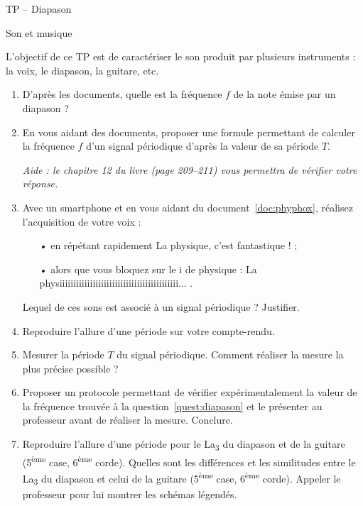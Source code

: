 \documentclass[12pt,a4paper]{article}
\begin{document}
\begin{header}
TP -- Diapason

Son et musique
\end{header}

L'objectif de ce TP est de caractériser le son produit par plusieurs instruments : la voix, le diapason, la guitare, etc.

\begin{enumerate}
\item \app{}
\label{quest:diapason}

D'après les documents, quelle est la fréquence $f$ de la note émise par un diapason ?

\item \app{}

En vous aidant des documents, proposer une formule permettant de calculer la fréquence $f$ d'un signal périodique d'après la valeur de sa période $T$.

\emph{Aide : le chapitre 12 du livre (page 209--211) vous permettra de vérifier votre réponse.}

\item \rea{} \anarai{}

Avec un smartphone et en vous aidant du document~\ref{doc:phyphox}, réalisez l'acquisition de votre voix : 
\begin{itemize}
\item[•] en répétant rapidement \og La physique, c'est fantastique !\fg{} ;
\item[•] alors que vous bloquez sur le \og i \fg{} de physique : \og La physiiiiiiiiiiiiiiiiiiiiiiiiiiiiiiiiiiiiiiiiiii... \fg{}.
\end{itemize}
Lequel de ces sons est associé à un signal périodique ?
Justifier.

\item \rea{}

Reproduire l'allure d'une période sur votre compte-rendu.

\item \rea{}

Mesurer la période $T$ du signal périodique.
Comment réaliser la mesure la plus précise possible ?

\item \anarai{} \val{} \com{}

Proposer un protocole permettant de vérifier expérimentalement la valeur de la fréquence trouvée à la question~\ref{quest:diapason} et le présenter au professeur avant de réaliser la mesure.
Conclure.

\appelprof{\anarai{}}

\item  \rea{} \app{}

Reproduire l'allure d'une période pour le La\textsubscript{3} du diapason et de la guitare (5\textsuperscript{ème} case, 6\textsuperscript{ème} corde).
Quelles sont les différences et les similitudes entre le La\textsubscript{3} du diapason et celui de la guitare (5\textsuperscript{ème} case, 6\textsuperscript{ème} corde).
Appeler le professeur pour lui montrer les schémas légendés.

\appelprof{\rea{}}

\end{enumerate}
\end{document}
